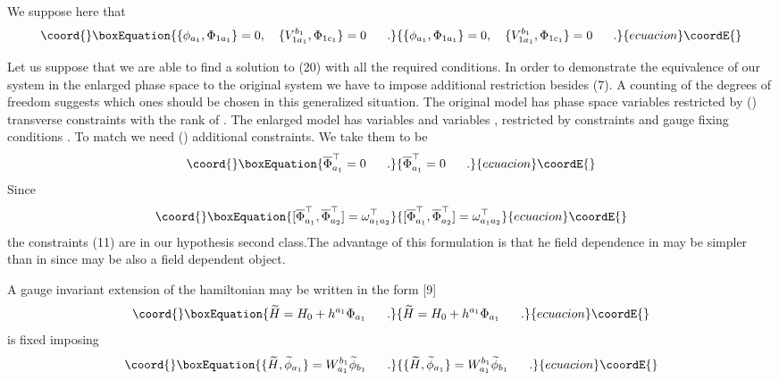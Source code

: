 \documentclass[a4paper,10pt]{article}
\begin{document}
We suppose here that
\begin{equation}\coord{}\boxEquation{
\label{10}
\{\phi_{a_1},\Phi_{1a_1}\}=0,\ \ \ \{V_{1a_1}^{b_1},\Phi_{1c_1}\}=0
\ \ \ \ \ .
}{
\{\phi_{a_1},\Phi_{1a_1}\}=0,\ \ \ \{V_{1a_1}^{b_1},\Phi_{1c_1}\}=0
\ \ \ \ \ .
}{ecuacion}\coordE{}\end{equation}


Let us suppose that we are able to find a solution to (20) with all the
required conditions. In order to demonstrate the equivalence of our system in
the enlarged phase  space to the original system we have to impose additional
restriction besides  (7). A counting of the degrees of freedom suggests which
ones should be  chosen in this generalized situation. The original model has
\coordHE{} phase  space variables \coordHE{} restricted by (\coordHE{}) transverse constraints
with  \coordHE{} the rank of \coordHE{}. The enlarged model has \coordHE{} variables
\coordHE{} and \coordHE{} variables \myHighlight{$\xi$}\coordHE{}, \myHighlight{$\eta$}\coordHE{} restricted by \coordHE{} constraints
\coordHE{} and \coordHE{} gauge fixing conditions \coordHE{}. To match
we need (\coordHE{}) additional constraints. We take them to be
\begin{equation}\coord{}\boxEquation{
\label{11}
\ov{\Phi}_{a_1}^\top =0\ \ \ \ \ .
}{
\ov{\Phi}_{a_1}^\top =0\ \ \ \ \ .
}{ecuacion}\coordE{}\end{equation}
Since
\begin{equation}\coord{}\boxEquation{
\label{12}
[\ov{\Phi}_{a_1}^\top ,\ov{\Phi}_{a_2}^\top ]=\omega_{a_1a_2}^\top
}{
[\ov{\Phi}_{a_1}^\top ,\ov{\Phi}_{a_2}^\top ]=\omega_{a_1a_2}^\top
}{ecuacion}\coordE{}\end{equation}
the constraints (11) are in our hypothesis second class.The advantage of
this formulation is that he field dependence in \coordHE{}   may
be simpler than in \coordHE{} since  \coordHE{} may be
also a field dependent object.

A gauge invariant extension of the hamiltonian \coordHE{} may be written in the
form [9]
\begin{equation}\coord{}\boxEquation{
\label{13}
\wt{H}=H_0+h^{a_1}\Phi_{a_1}\ \ \ \ \ .
}{
\wt{H}=H_0+h^{a_1}\Phi_{a_1}\ \ \ \ \ .
}{ecuacion}\coordE{}\end{equation}
\coordHE{} is fixed imposing
\begin{equation}\coord{}\boxEquation{
\label{14}
\{\wt{H},\wt{\phi}_{a_1}\} =W_{a_1}^{b_1}\wt{\phi}_{b_1}\ \ \ \ \ .
}{
\{\wt{H},\wt{\phi}_{a_1}\} =W_{a_1}^{b_1}\wt{\phi}_{b_1}\ \ \ \ \ .
}{ecuacion}\coordE{}\end{equation}
\end{document}
